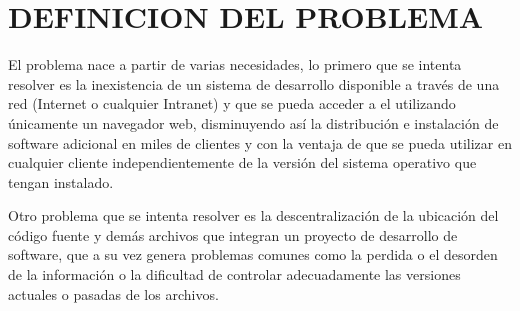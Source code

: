 ﻿\section{DEFINICION DEL PROBLEMA}

El problema nace a partir de varias necesidades, lo primero que se intenta resolver es la inexistencia de un sistema de desarrollo disponible a través de una red (Internet o cualquier Intranet) y que se pueda acceder a el utilizando únicamente un navegador web, disminuyendo así la distribución e instalación de software adicional en miles de clientes y con la ventaja de que se pueda utilizar en cualquier cliente independientemente de la versión del sistema operativo que tengan instalado.

Otro problema que se intenta resolver es la descentralización de la ubicación del código fuente y demás archivos que integran un proyecto de desarrollo de software, que a su vez genera problemas comunes como la perdida o el desorden de la información o la dificultad de controlar adecuadamente las versiones actuales o pasadas de los archivos.